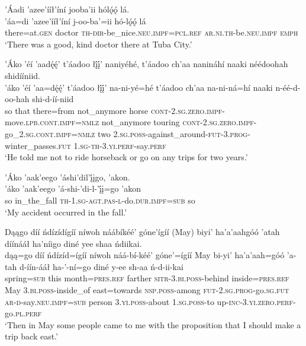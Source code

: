 \ea\label{ex:text7-8-6}
’Áadi ’azee’ííł’íní jooba’ii hólǫ́ǫ́ lá.\\
\gll ’áa=di	’azee’ííł’íní	j-oo-ba’=ii	hó-lǫ́ǫ́	lá\\
     there=at.\textsc{gen}	doctor	\textsc{th}-\textsc{dir}-be\_nice.\textsc{neu}.\textsc{impf}=\textsc{pcl}.\textsc{ref}	\textsc{ar}.\textsc{ni}.\textsc{th}-be.\textsc{neu}.\textsc{impf}	\textsc{emph}\\
\glt `There was a good, kind doctor there at Tuba City.'
\z

\ea\label{ex:text7-8-7}
’Áko ’éí ’aadę́ę́’ t’áadoo łį́į́’ naniyéhé, t’áadoo ch’aa nanináhí naaki néédoohah shidííniid.\\
\gll ’áko	’éí	’aa=dę́ę́’	t’áadoo	łį́į́’	na-ni-yé=hé	t’áadoo	ch’aa	na-ni-ná=hí	naaki	n-éé-d-oo-hah	shi-d-íí-niid\\
     so	that	there=from	not\_anymore	horse	\textsc{cont}-2.\textsc{sg}.\textsc{zero}.\textsc{impf}-move.\textsc{lpb}.\textsc{cont}.\textsc{impf}=\textsc{nmlz}	not\_anymore	touring	\textsc{cont}-2.\textsc{sg}.\textsc{zero}.\textsc{impf}-go\_2.\textsc{sg}.\textsc{cont}.\textsc{impf}=\textsc{nmlz}	two	2.\textsc{sg}.\textsc{poss}-against\_around-\textsc{fut}-3.\textsc{prog}-winter\_passes.\textsc{fut}	1.\textsc{sg}-\textsc{th}-3.\textsc{yi}.\textsc{perf}-say.\textsc{perf}\\
\glt `He told me not to ride horseback or go on any trips for two years.'
\z

\ea\label{ex:text7-8-8}
’Áko ’aak’eego ’áshi’dil’į́įgo, ’akon.\\
\gll ’áko	’aak’eego	’á-shi-’di-l-’į́į=go	’akon\\
     so	in\_the\_fall	\textsc{th}-1.\textsc{sg}-\textsc{agt}.\textsc{pas}-\textsc{l}-do.\textsc{dur}.\textsc{impf}=\textsc{sub}	so\\
\glt `My accident occurred in the fall.'
\z

\ea\label{ex:text7-8-9}
Dąągo díí ńdízídígíí níwoh náábíkéé’ góne’ígíí (May) biyi’ ha’a’aahgóó ’atah díínááł ha’níigo diné yee shaa ńdiikai.\\
\gll dąą=go	díí	ńdízíd=ígíí	níwoh	náá-bí-kéé’	góne’=ígíí	May	bi-yi’	ha’a’aah=góó	’a-tah	d-íín-ááł	ha-’-ní=go	diné	y-ee	sh-aa	ń-d-ii-kai\\
     spring=\textsc{sub}	this	month=\textsc{pres}.\textsc{ref}	farther	\textsc{sitr}-3.\textsc{bi}.\textsc{poss}-behind	inside=\textsc{pres}.\textsc{ref}	May	3.\textsc{bi}.\textsc{poss}-inside\_of	east=towards	\textsc{nsp}.\textsc{poss}-among	\textsc{fut}-2.\textsc{sg}.\textsc{prog}-go.\textsc{sg}.\textsc{fut}	\textsc{ar}-\textsc{d}-say.\textsc{neu}.\textsc{impf}=\textsc{sub}	person	3.\textsc{yi}.\textsc{poss}-about	1.\textsc{sg}.\textsc{poss}-to	up-\textsc{inc}-3.\textsc{yi}.\textsc{zero}.\textsc{perf}-go.\textsc{pl}.\textsc{perf}\\
\glt `Then in May some people came to me with the proposition that I should make a trip back east.'
\z

